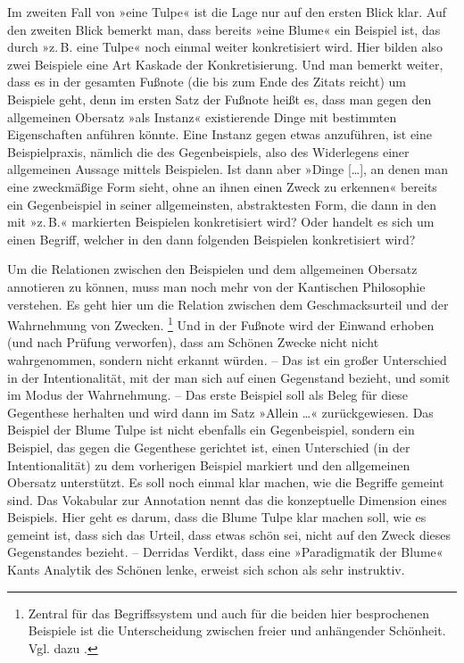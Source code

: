 \documentclass{article}
\renewcommand*{\see}{\autocap{v}gl\adddot}%
\begin{document}
Im zweiten Fall von »eine Tulpe« ist die Lage nur auf den ersten Blick
klar. Auf den zweiten Blick bemerkt man, dass bereits »eine Blume« ein
Beispiel ist, das durch »z.\,B. eine Tulpe« noch einmal weiter
konkretisiert wird. Hier bilden also zwei Beispiele eine Art Kaskade
der Konkretisierung. Und man bemerkt weiter, dass es in der gesamten
Fußnote (die bis zum Ende des Zitats reicht) um Beispiele geht, denn
im ersten Satz der Fußnote heißt es, dass man gegen den allgemeinen
Obersatz »als Instanz« existierende Dinge mit bestimmten Eigenschaften
anführen könnte. Eine Instanz gegen etwas anzuführen, ist eine
Beispielpraxis, nämlich die des Gegenbeispiels, also des Widerlegens
einer allgemeinen Aussage mittels Beispielen. Ist dann aber »Dinge
[…], an denen man eine zweckmäßige Form sieht, ohne an ihnen einen
Zweck zu erkennen« bereits ein Gegenbeispiel in seiner allgemeinsten,
abstraktesten Form, die dann in den mit »z.\,B.« markierten Beispielen
konkretisiert wird? Oder handelt es sich um einen Begriff, welcher in
den dann folgenden Beispielen konkretisiert wird?

Um die Relationen zwischen den Beispielen und dem allgemeinen Obersatz
annotieren zu können, muss man noch mehr von der Kantischen
Philosophie verstehen. Es geht hier um die Relation zwischen dem
Geschmacksurteil und der Wahrnehmung von Zwecken.%
\footnote{Zentral für das Begriffssystem und auch für die beiden hier
  besprochenen Beispiele ist die Unterscheidung zwischen freier und
  anhängender Schönheit. Vgl. dazu \textcite{Guesken2018a}.} %
Und in der Fußnote wird der Einwand erhoben (und nach Prüfung
verworfen), dass am Schönen Zwecke nicht
nicht %
wahrgenommen, sondern nicht erkannt würden. -- Das ist ein großer
Unterschied in der Intentionalität, mit der man sich auf einen
Gegenstand bezieht, und somit im Modus der Wahrnehmung. -- Das erste
Beispiel soll als Beleg für diese Gegenthese herhalten und wird dann
im Satz »Allein …« zurückgewiesen. Das Beispiel der Blume Tulpe ist
nicht ebenfalls ein Gegenbeispiel, sondern ein Beispiel, das gegen die
Gegenthese gerichtet ist, einen Unterschied (in der Intentionalität)
zu dem vorherigen Beispiel markiert und den allgemeinen Obersatz
unterstützt. Es soll noch einmal klar machen, wie die Begriffe gemeint
sind. Das Vokabular zur Annotation nennt das die konzeptuelle
Dimension eines Beispiels. \Parencite[\see\ auch][]{CL2013b} Hier geht
es darum, dass die Blume Tulpe klar machen soll, wie es gemeint ist,
dass sich das Urteil, dass etwas schön sei, nicht auf den Zweck dieses
Gegenstandes bezieht. -- Derridas Verdikt, dass eine »Paradigmatik der
Blume« Kants Analytik des Schönen lenke, erweist sich schon als sehr
instruktiv.
\end{document}
